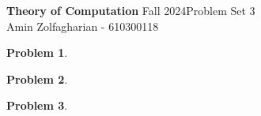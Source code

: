 \documentclass[12pt]{article}
\newcommand{\customanswer}[1]{%
\begin{problem}
\end{problem}

}
\newtheorem{problem}{Problem}
\begin{document}
\noindent \textbf{Theory of Computation} Fall 2024\hfill Problem Set 3\\
Amin Zolfagharian - 610300118

\hrulefill

\customanswer{1}
\customanswer{2}
\customanswer{3}
\end{document}
